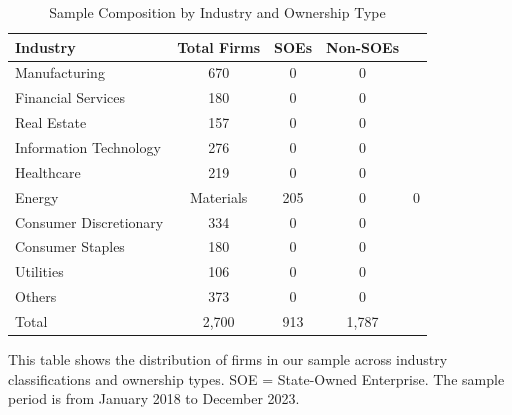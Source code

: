\begin{table}[htbp]
\centering
\caption{Sample Composition by Industry and Ownership Type}
\label{tab:sample_composition}
\begin{threeparttable}
\begin{tabular}{lccc}
\toprule
Industry & Total Firms & SOEs & Non-SOEs \\
\midrule
Manufacturing & 670 & 0 & 0 \\
Financial Services & 180 & 0 & 0 \\
Real Estate & 157 & 0 & 0 \\
Information Technology & 276 & 0 & 0 \\
Healthcare & 219 & 0 & 0 \\
Energy & Materials & 205 & 0 & 0 \\
Consumer Discretionary & 334 & 0 & 0 \\
Consumer Staples & 180 & 0 & 0 \\
Utilities & 106 & 0 & 0 \\
Others & 373 & 0 & 0 \\

\midrule
Total & 2,700 & 913 & 1,787 \\

\bottomrule
\end{tabular}
\begin{tablenotes}
\small
\item This table shows the distribution of firms in our sample across industry classifications and ownership types. SOE = State-Owned Enterprise. The sample period is from January 2018 to December 2023.
\end{tablenotes}
\end{threeparttable}
\end{table}




